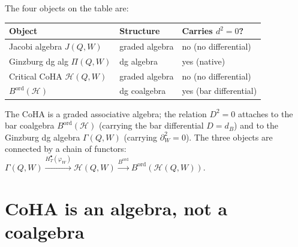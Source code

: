 \begin{remark}
\label{rem:four-inputs-four-outputs-platonic}
The four objects on the table are:
\begin{center}
\renewcommand{\arraystretch}{1.15}
\begin{tabular}{lll}
\toprule
Object & Structure & Carries $d^2 = 0$? \\
\midrule
Jacobi algebra $J(Q, W)$ & graded algebra & no (no differential) \\
Ginzburg dg alg $\Pi(Q, W)$ & dg algebra & yes (native) \\
Critical CoHA $\mathcal{H}(Q, W)$ & graded algebra & no (no differential) \\
$B^{\mathrm{ord}}(\mathcal{H})$ & dg coalgebra & yes (bar differential) \\
\bottomrule
\end{tabular}
\end{center}
The CoHA is a graded associative algebra; the relation
$D^2 = 0$ attaches to the bar coalgebra $B^{\mathrm{ord}}(\mathcal{H})$
(carrying the bar differential $D = d_B$) and to the Ginzburg dg
algebra $\Gamma(Q, W)$ (carrying $\partial_W^2 = 0$). The three
objects are connected by a chain of functors:
$\Gamma(Q, W) \xrightarrow{H^\bullet_T(\varphi_W)} \mathcal{H}(Q, W)
\xrightarrow{B^{\mathrm{ord}}} B^{\mathrm{ord}}(\mathcal{H}(Q, W))$.
\end{remark}

\section{CoHA is an algebra, not a coalgebra}
\label{sec:coha-is-algebra}

